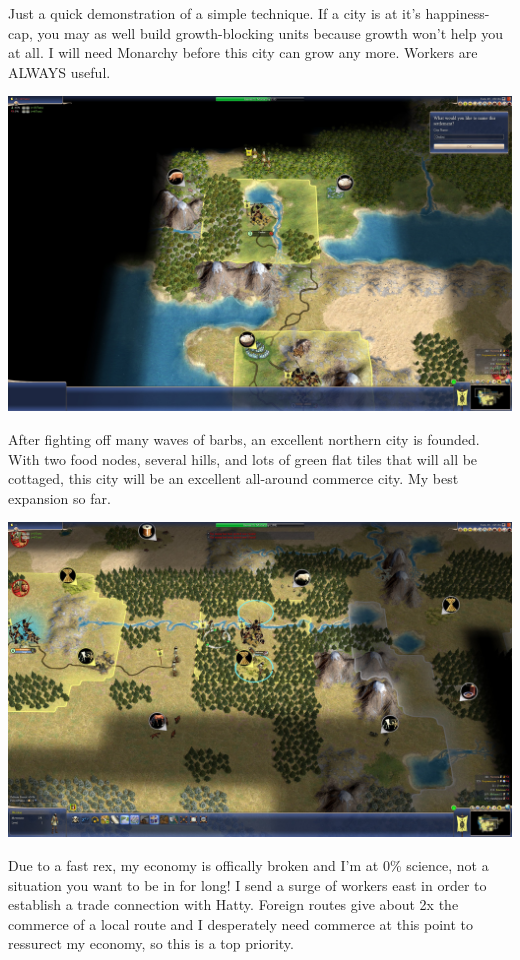 \documentclass[10pt]{article}
\begin{document}
Just a quick demonstration of a simple technique. If a city is at it's happiness-cap, you may as well build
growth-blocking units because growth won't help you at all. I will need Monarchy before this city can
grow any more. Workers are ALWAYS useful.

\includegraphics[width=1.0\textwidth]{57}

After fighting off many waves of barbs, an excellent northern city is founded. With two food nodes, several
hills, and lots of green flat tiles that will all be cottaged, this city will be an excellent all-around
commerce city. My best expansion so far.

\includegraphics[width=1.0\textwidth]{58}

Due to a fast rex, my economy is offically broken and I'm at 0\% science, not a situation you want to be in
for long! I send a surge of workers east in order to establish a trade connection with Hatty. Foreign routes
give about 2x the commerce of a local route and I desperately need commerce at this point to ressurect my
economy, so this is a top priority.
\end{document}
